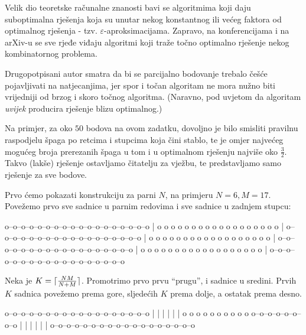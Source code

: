 Velik dio teoretske računalne znanosti bavi se algoritmima koji daju
suboptimalna rješenja koja su unutar nekog konstantnog ili većeg faktora
od optimalnog rješenja - tzv. $\varepsilon$-aproksimacijama. 
Zapravo, na konferencijama i na arXiv-u se sve rjeđe viđaju
algoritmi koji traže točno optimalno rješenje nekog kombinatornog problema.

Drugopotpisani autor smatra da bi se parcijalno bodovanje trebalo češće 
pojavljivati na natjecanjima, jer spor i točan algoritam ne mora nužno
biti vrijedniji od brzog i skoro točnog algoritma. (Naravno, pod uvjetom
da algoritam \textit{uvijek} producira rješenje blizu optimalnog.)

Na primjer, za oko $50$ bodova na ovom zadatku, dovoljno je bilo smisliti 
pravilnu raspodjelu špaga po retcima i stupcima koja čini stablo, te je
omjer najvećeg mogućeg broja prerezanih špaga u tom i u optimalnom rješenju
najviše oko $\frac{3}{2}$. Takvo
(lakše) rješenje ostavljamo čitatelju za vježbu, te predstavljamo samo
rješenje za sve bodove.

Prvo ćemo pokazati konstrukciju za parni $N$, na primjeru $N = 6, M = 17$.
Povežemo prvo sve sadnice u parnim redovima i sve sadnice u zadnjem stupcu:
\begin{verbbox}
o--o--o--o--o--o--o--o--o--o--o--o--o--o--o--o--o--o
                                                   |
o  o  o  o  o  o  o  o  o  o  o  o  o  o  o  o  o  o
                                                   |
o--o--o--o--o--o--o--o--o--o--o--o--o--o--o--o--o--o
                                                   |
o  o  o  o  o  o  o  o  o  o  o  o  o  o  o  o  o  o
                                                   |
o--o--o--o--o--o--o--o--o--o--o--o--o--o--o--o--o--o
                                                   |
o  o  o  o  o  o  o  o  o  o  o  o  o  o  o  o  o  o
                                                   |
o--o--o--o--o--o--o--o--o--o--o--o--o--o--o--o--o--o
\end{verbbox}
\begin{figure}[H]
  \centering
  \theverbbox
\end{figure}

Neka je $K = \lceil\frac{NM}{N + M}\rceil$. Promotrimo prvo
prvu ``prugu'', i sadnice u sredini. Prvih $K$ sadnica povežemo prema gore,
sljedećih $K$ prema dolje, a ostatak prema desno.

\begin{verbbox}
o--o--o--o--o--o--o--o--o--o--o--o--o--o--o--o--o--o
|  |  |  |  |                                      |
o  o  o  o  o  o  o  o  o  o  o--o--o--o--o--o--o--o
               |  |  |  |  |                       |
o--o--o--o--o--o--o--o--o--o--o--o--o--o--o--o--o--o
\end{verbbox}
\begin{figure}[H]
  \centering
  \theverbbox
\end{figure}

